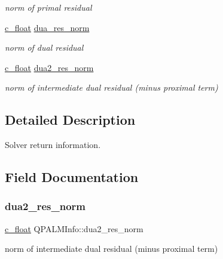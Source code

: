 \begin{DoxyCompactItemize}
\begin{DoxyCompactList}\small\item\em norm of primal residual \end{DoxyCompactList}\item 
\mbox{\hyperlink{global__opts_8h_a7f1a9fda95e52979658c20a0d134fb15}{c\+\_\+float}} \mbox{\hyperlink{structQPALMInfo_ad9e5596b60be7e567f1d936a80046f10}{dua\+\_\+res\+\_\+norm}}
\begin{DoxyCompactList}\small\item\em norm of dual residual \end{DoxyCompactList}\item 
\mbox{\hyperlink{global__opts_8h_a7f1a9fda95e52979658c20a0d134fb15}{c\+\_\+float}} \mbox{\hyperlink{structQPALMInfo_a646b39a446df4d60f9d7bd8a8d3adf4b}{dua2\+\_\+res\+\_\+norm}}
\begin{DoxyCompactList}\small\item\em norm of intermediate dual residual (minus proximal term) \end{DoxyCompactList}\end{DoxyCompactItemize}


\subsection{Detailed Description}
Solver return information. 

\subsection{Field Documentation}
\mbox{\label{structQPALMInfo_a646b39a446df4d60f9d7bd8a8d3adf4b}} 
\subsubsection{\texorpdfstring{dua2\_res\_norm}{dua2\_res\_norm}}
{\footnotesize\ttfamily \mbox{\hyperlink{global__opts_8h_a7f1a9fda95e52979658c20a0d134fb15}{c\+\_\+float}} Q\+P\+A\+L\+M\+Info\+::dua2\+\_\+res\+\_\+norm}



norm of intermediate dual residual (minus proximal term) 

\mbox{\label{structQPALMInfo_ad9e5596b60be7e567f1d936a80046f10}} 

